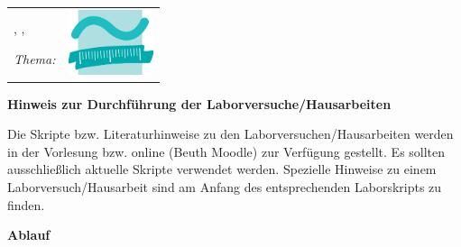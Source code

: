 \begin{coverpages}
	
	\setlength{\parskip}{10pt}
	\setlength{\parindent}{0pt}
	
	\vspace{2cm}
	\normalsize
	\begin{tabularx}{\textwidth}{ p{13.75cm} | r }
	    \toprule
		\textbf{\thislecture}  & \multirow{4}{*}{\quad 
		\includegraphics[width=2.5cm]{BilderPDF/beuth.eps}} \\
		\thisexam, \thisdate, \thissemester &  \\
		\cline{1-1}
		\emph{Thema:}  & \\
		\thistheme &  \\
		\bottomrule
	\end{tabularx}

	
	\vspace{2cm}
	\LARGE\textbf{Hinweis zur Durchführung der Laborversuche/Hausarbeiten}
	
\normalsize
Die Skripte bzw. Literaturhinweise zu den Laborversuchen/Hausarbeiten werden in der Vorlesung bzw. online (Beuth Moodle) zur
Verfügung gestellt. Es sollten ausschlie\ss lich aktuelle Skripte verwendet werden. Spezielle Hinweise
zu einem Laborversuch/Hausarbeit sind am Anfang des entsprechenden Laborskripts zu finden.
	
\textbf{Ablauf}


\end{coverpages}
